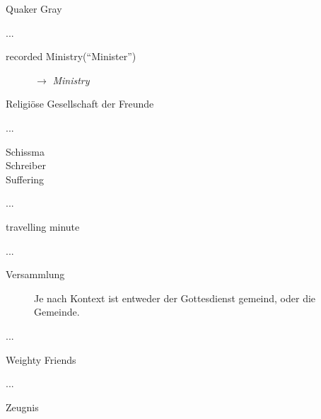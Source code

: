 \begin{description}
\begin{description}
 \item[Quaker Gray]
 \end{description}
 \item[R]...
\begin{description}
 \item[recorded Ministry("`Minister"')] $\to$ \textit{Ministry}
 \item[Religiöse Gesellschaft der Freunde]
 \end{description}
 \item[S]...
\begin{description}
 \item[Schissma]
 \item[Schreiber]
 \item[Suffering]
 \end{description}
 \item[T]...
\begin{description}
 \item[travelling minute]
 \end{description}
 \item[V]...
\begin{description}
 \item[Versammlung] Je nach Kontext ist entweder der Gottesdienst gemeind, oder die Gemeinde.
 \end{description}
 \item[W]...
\begin{description}
 \item[Weighty Friends]
 \end{description}
 \item[Z]...
\begin{description}
 \item[Zeugnis]
 \end{description}
 \end{description}

